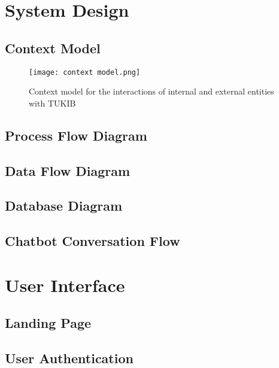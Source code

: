 \section{System Design}

\subsection{Context Model}

\begin{figure}[h]
	\centering 
	\texttt{[image: context model.png]}
	\caption{Context model for the interactions of internal and external entities with TUKIB}
	\label{fig:context_model}
\end{figure}

\subsection{Process Flow Diagram}

\subsection{Data Flow Diagram}

\subsection{Database Diagram}

\subsection{Chatbot Conversation Flow}

\section{User Interface}

\subsection{Landing Page}

\subsection{User Authentication}